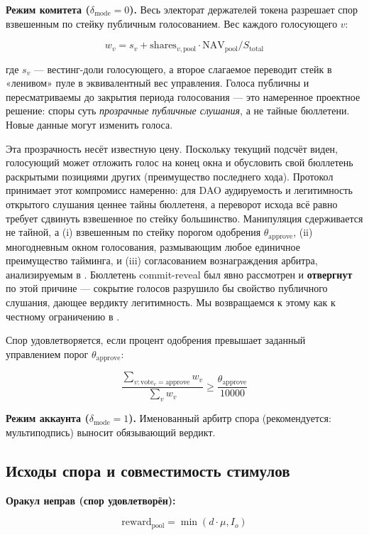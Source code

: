 \documentclass{ledger}
\theoremstyle{plain}
\theoremstyle{remark}
\begin{document}
\textbf{Режим комитета ($\delta_{\text{mode}} = 0$).} Весь электорат держателей
токена разрешает спор взвешенным по стейку публичным голосованием. Вес каждого
голосующего $v$:

\[
w_v = s_v + \text{shares}_{v,\text{pool}} \cdot \text{NAV}_{\text{pool}} /
S_{\text{total}}
\]

где $s_v$ --- вестинг-доли голосующего, а второе слагаемое переводит стейк в
«ленивом» пуле в эквивалентный вес управления. Голоса публичны и пересматриваемы до
закрытия периода голосования --- это намеренное проектное решение: споры суть
\emph{прозрачные публичные слушания}, а не тайные бюллетени. Новые данные могут
изменить голоса.

Эта прозрачность несёт известную цену. Поскольку текущий подсчёт виден, голосующий
может отложить голос на конец окна и обусловить свой бюллетень раскрытыми позициями
других (преимущество последнего хода). Протокол принимает этот компромисс намеренно:
для DAO аудируемость и легитимность открытого слушания ценнее тайны бюллетеня, а
переворот исхода всё равно требует сдвинуть взвешенное по стейку большинство.
Манипуляция сдерживается не тайной, а (i) взвешенным по стейку порогом одобрения
$\theta_{\text{approve}}$, (ii) многодневным окном голосования, размывающим любое
единичное преимущество тайминга, и (iii) согласованием вознаграждения арбитра,
анализируемым в . Бюллетень commit-reveal был явно рассмотрен и
\textbf{отвергнут} по этой причине --- сокрытие голосов разрушило бы свойство
публичного слушания, дающее вердикту легитимность. Мы возвращаемся к этому как к
честному ограничению в .

Спор удовлетворяется, если процент одобрения превышает заданный управлением порог
$\theta_{\text{approve}}$:

\[
\frac{\sum_{v: \text{vote}_v = \text{approve}} w_v}{\sum_{v} w_v} \geq
\frac{\theta_{\text{approve}}}{10000}
\]

\textbf{Режим аккаунта ($\delta_{\text{mode}} = 1$).} Именованный арбитр спора
(рекомендуется: мультиподпись) выносит обязывающий вердикт.

\subsection{Исходы спора и совместимость стимулов}

\textbf{Оракул неправ (спор удовлетворён):}

\[
\text{reward}_{\text{pool}} = \min(d \cdot \mu, I_o)
\]
\end{document}
